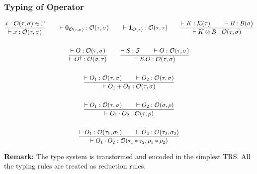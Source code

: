 \subsubsection*{Typing of Operator}
  \begin{gather*}
  \frac{x : \mathcal{O}(\tau, \sigma) \in \Gamma}{\vdash x : \mathcal{O}(\tau, \sigma)}
  \qquad
  \vdash \mathbf{0}_{\mathcal{O}(\tau, \sigma)} : \mathcal{O}(\tau, \sigma) 
  \qquad
  \vdash \textbf{1}_{\mathcal{O}(\tau)} : \mathcal{O}(\tau, \tau) 
  \qquad
  \frac{\vdash K : \mathcal{K}(\tau) \qquad \vdash B : \mathcal{B}(\sigma)}{\vdash K \otimes B : \mathcal{O}(\tau, \sigma)} \\
  \\
  \frac{\vdash O : \mathcal{O}(\tau, \sigma)}{\vdash O^\dagger : \mathcal{O}(\sigma, \tau)}
  \qquad
  \frac{\vdash S : \mathcal{S} \qquad \vdash O : \mathcal{O}(\tau, \sigma)}{\vdash S.O : \mathcal{O}(\tau, \sigma)} \\
  \\
  \frac{\vdash O_1 : \mathcal{O}(\tau, \sigma) \qquad \vdash O_2 : \mathcal{O}(\tau, \sigma)}{\vdash O_1 + O_2 : \mathcal{O}(\tau, \sigma)} \\
  \\
  \frac{\vdash O_1 : \mathcal{O}(\tau, \sigma) \qquad \vdash O_2 : \mathcal{O}(\sigma, \rho)}{\vdash O_1 \cdot O_2 : \mathcal{O}(\tau, \rho)} \\
  \\
  \frac{\vdash O_1 : \mathcal{O}(\tau_1, \sigma_1) \qquad \vdash O_2 : \mathcal{O}(\tau_2, \sigma_2)}{\vdash O_1 \cdot O_2 : \mathcal{O}(\tau_1 * \tau_2, \rho_1 * \rho_2)}
\end{gather*}

\textbf{Remark: } The type system is transformed and encoded in the simplest TRS. All the typing rules are treated as reduction rules.